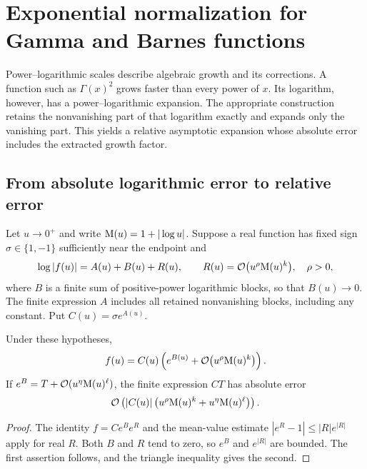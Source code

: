 \section{Exponential normalization for Gamma and Barnes functions}
\label{sec:exponential-normalization}

Power--logarithmic scales describe algebraic growth and its corrections.
A function such as $\Gamma(x)^2$ grows faster than every power of $x$.
Its logarithm, however, has a power--logarithmic expansion. The appropriate
construction retains the nonvanishing part of that logarithm exactly and
expands only the vanishing part. This yields a relative asymptotic expansion
whose absolute error includes the extracted growth factor.

\subsection{From absolute logarithmic error to relative error}

Let $u\to0^+$ and write $\mathrm M(u)=1+|\log u|$. Suppose a real function has fixed
sign $\sigma\in\{1,-1\}$ sufficiently near the endpoint and
\begin{equation}
 \log|f(u)|=A(u)+B(u)+R(u),\qquad
 R(u)=\mathcal O\bigl(u^\rho \mathrm M(u)^k\bigr),\quad \rho>0,
 \label{eq:logarithmic-normalization}
\end{equation}
where $B$ is a finite sum of positive-power logarithmic blocks, so that
$B(u)\to0$. The finite expression $A$ includes all retained nonvanishing
blocks, including any constant. Put $C(u)=\sigma e^{A(u)}$.

\begin{proposition}
Under these hypotheses,
\begin{equation}
 f(u)=C(u)\left(e^{B(u)}+
           \mathcal O\bigl(u^\rho \mathrm M(u)^k\bigr)\right).
 \label{eq:relative-normalization}
\end{equation}
If $e^B=T+\mathcal O(u^\eta \mathrm M(u)^\ell)$, the finite expression $C T$ has
absolute error
\begin{equation}
 \mathcal O\left(|C(u)|
    \left(u^\rho \mathrm M(u)^k+u^\eta \mathrm M(u)^\ell\right)\right).
 \label{eq:normalized-absolute-error}
\end{equation}
\end{proposition}
\begin{proof}
The identity $f=C e^B e^R$ and the mean-value estimate
$|e^R-1|\le |R|e^{|R|}$ apply for real $R$.
Both $B$ and $R$ tend to zero, so $e^B$ and $e^{|R|}$ are bounded.
The first assertion follows, and the triangle inequality gives the second.
\end{proof}


